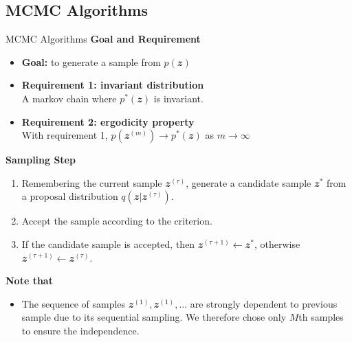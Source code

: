 \documentclass{bredelebeamer}
\begin{document}
\subsection{MCMC Algorithms}
\begin{frame}{MCMC Algorithms}
  \textbf{Goal and Requirement}
  \begin{itemize}
    \item \textbf{Goal:} to generate a sample from $p(\mathbfit{z})$
    \item \textbf{Requirement 1: invariant distribution} \\
    A markov chain where $p^{*}(\mathbfit{z})$ is invariant.
    \item \textbf{Requirement 2: ergodicity property} \\
    With requirement 1, $p(\mathbfit{z}^{(m)}) \rightarrow p^{*}(\mathbfit{z})$ as $m \rightarrow \infty$
  \end{itemize}

  \textbf{Sampling Step}
  \begin{enumerate}
    \item Remembering the current sample $\mathbfit{z}^{(\tau)}$, generate
    a candidate sample $\mathbfit{z}^{*}$ from a proposal distribution
    $q(\mathbfit{z}|\mathbfit{z}^{(\tau)})$.
    \item Accept the sample according to the criterion.
    \item If the candidate sample is accepted, then
    $\mathbfit{z}^{(\tau+1)} \leftarrow \mathbfit{z}^{*}$,
    otherwise
    $\mathbfit{z}^{(\tau+1)} \leftarrow \mathbfit{z}^{(\tau)}$.
  \end{enumerate}

  \textbf{Note that}
  \begin{itemize}
    \item The sequence of samples $\mathbfit{z}^{(1)}, \mathbfit{z}^{(1)}, \ldots$
    are strongly dependent to previous sample due to its sequential sampling.
    We therefore chose only $M$th samples to ensure the independence.
  \end{itemize}
\end{frame}
\end{document}
